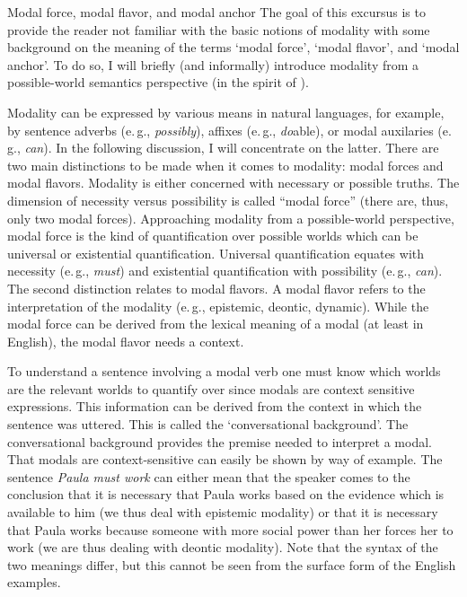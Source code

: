 \begin{digression}{{Modal force, modal flavor, and modal anchor}}{}
\noindent The goal of this excursus is to provide the reader not familiar with the basic notions of modality with some background on the meaning of the terms `modal force', `modal flavor', and `modal anchor'. To do so, I will briefly (and informally) introduce modality from a possible-world semantics perspective (in the spirit of \citealt{kratzer1981, kratzer1991}).

Modality can be expressed by various means in natural languages, for example, by sentence adverbs (e.\,g., \textit{possibly}), affixes (e.\,g., \textit{do}able), or modal auxilaries (e.\,g., \textit{can}). In the following discussion, I will concentrate on the latter. There are two main distinctions to be made when it comes to modality: modal forces and modal flavors. Modality is either concerned with necessary or possible truths. The dimension of necessity versus possibility is called ``modal force'' (there are, thus, only two modal forces). Approaching modality from a possible-world perspective, modal force is the kind of quantification over possible worlds which can be universal or existential quantification. Universal quantification equates with necessity (e.\,g., \textit{must}) and existential quantification with possibility (e.\,g., \textit{can}). The second distinction relates to modal flavors. A modal flavor refers to the interpretation of the modality (e.\,g., epistemic, deontic, dynamic). While the modal force can be derived from the lexical meaning of a modal (at least in English), the modal flavor needs a context.

To understand a sentence involving a modal verb one must know which worlds are the relevant worlds to quantify over since modals are context sensitive expressions. This information can be derived from the context in which the sentence was uttered. This is called the `conversational background'. The conversational background provides the premise needed to interpret a modal. That modals are context-sensitive can easily be shown by way of example. The sentence \textit{Paula must work} can either mean that the speaker comes to the conclusion that it is necessary that Paula works based on the evidence which is available to him (we thus deal with epistemic modality) or that it is necessary that Paula works because someone with more social power than her forces her to work (we are thus dealing with deontic modality). Note that the syntax of the two meanings differ, but this cannot be seen from the surface form of the English examples.


\end{digression}
